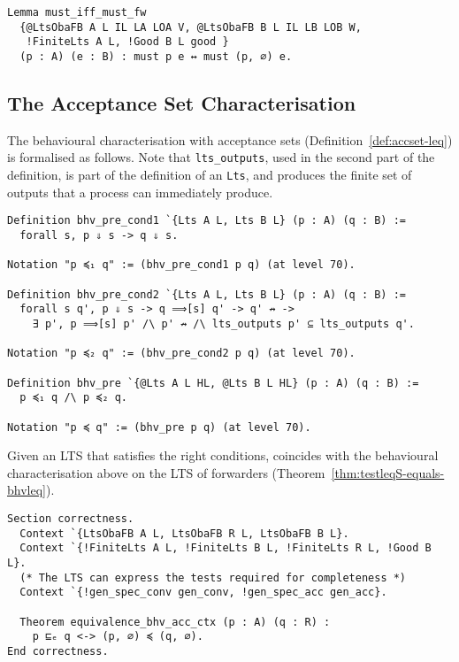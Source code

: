 \begin{mdframed}
\begin{verbatim}
Lemma must_iff_must_fw
  {@LtsObaFB A L IL LA LOA V, @LtsObaFB B L IL LB LOB W,
   !FiniteLts A L, !Good B L good }
  (p : A) (e : B) : must p e ↔ must (p, ∅) e.
\end{verbatim}
\end{mdframed}

\subsection{The Acceptance Set Characterisation}

The behavioural characterisation with acceptance sets
(Definition~\ref{def:accset-leq}) is formalised as follows.
%
Note that \lstinline|lts_outputs|, used in the second part of the definition, is
part of the definition of an \lstinline|Lts|, and produces the finite set of
outputs that a process can immediately produce.

\begin{mdframed}
\begin{verbatim}
Definition bhv_pre_cond1 `{Lts A L, Lts B L} (p : A) (q : B) :=
  forall s, p ⇓ s -> q ⇓ s.

Notation "p ≼₁ q" := (bhv_pre_cond1 p q) (at level 70).

Definition bhv_pre_cond2 `{Lts A L, Lts B L} (p : A) (q : B) :=
  forall s q', p ⇓ s -> q ⟹[s] q' -> q' ↛ ->
    ∃ p', p ⟹[s] p' /\ p' ↛ /\ lts_outputs p' ⊆ lts_outputs q'.

Notation "p ≼₂ q" := (bhv_pre_cond2 p q) (at level 70).

Definition bhv_pre `{@Lts A L HL, @Lts B L HL} (p : A) (q : B) :=
  p ≼₁ q /\ p ≼₂ q.

Notation "p ≼ q" := (bhv_pre p q) (at level 70).
\end{verbatim}
\end{mdframed}

Given an LTS that satisfies the right conditions, \mustequivalence coincides
with the behavioural characterisation above on the LTS of forwarders
(Theorem~\ref{thm:testleqS-equals-bhvleq}).

\begin{mdframed}
\begin{verbatim}
Section correctness.
  Context `{LtsObaFB A L, LtsObaFB R L, LtsObaFB B L}.
  Context `{!FiniteLts A L, !FiniteLts B L, !FiniteLts R L, !Good B L}.
  (* The LTS can express the tests required for completeness *)
  Context `{!gen_spec_conv gen_conv, !gen_spec_acc gen_acc}.

  Theorem equivalence_bhv_acc_ctx (p : A) (q : R) :
    p ⊑ₑ q <-> (p, ∅) ≼ (q, ∅).
End correctness.
\end{verbatim}
\end{mdframed}

